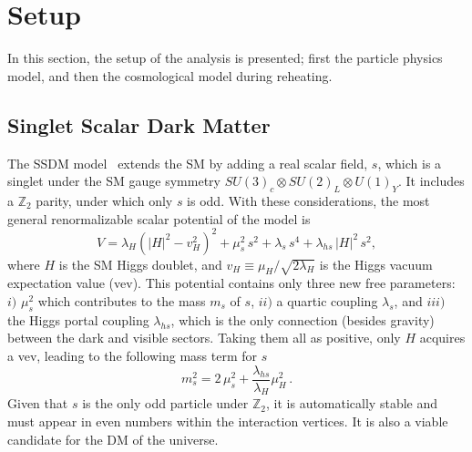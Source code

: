 \documentclass[a4paper,11pt]{article}
\newcommand{\lhs}{\lambda_{hs}}
\newcommand{\mdm}{m_s}
\begin{document}
\section{Setup} \label{sec:setup}
In this section, the setup of the analysis is presented; first the particle physics model, and then the cosmological model during reheating. 

\subsection{Singlet Scalar Dark Matter} %
The SSDM model~\cite{Silveira:1985rk, McDonald:1993ex, Burgess:2000yq} extends the SM by adding a real scalar field, $s$, which is a singlet under the SM gauge symmetry $SU(3)_c \otimes SU(2)_L \otimes U(1)_Y$. It includes a $\mathbb{Z}_2$ parity, under which only $s$ is odd. With these considerations, the most general renormalizable scalar potential of the model is
\begin{equation}
    V = \lambda_H\left(|H|^2-v_H^2\right)^2 + \mu_s^2\,s^2 + \lambda_s\,s^4 + \lhs\,|H|^2\,s^2,
\end{equation}
where $H$ is the SM Higgs doublet, and $v_H \equiv \mu_H/\sqrt{2\lambda_H}$ is the Higgs vacuum expectation value (vev). This potential contains only three new free parameters: $i)$ $\mu^2_s$ which contributes to the mass $\mdm$ of $s$, $ii)$ a quartic coupling $\lambda_s$, and $iii)$ the Higgs portal coupling $\lhs$, which is the only connection (besides gravity) between the dark and visible sectors.
Taking them all as positive, only $H$ acquires a vev, leading to the following mass term for $s$
\begin{equation}
    m^2_s = 2\,\mu_s^2+\frac{\lhs}{\lambda_H}\mu^2_H\,.
\end{equation}
Given that $s$ is the only odd particle under $\mathbb{Z}_2$, it is automatically stable and must appear in even numbers within the interaction vertices. It is also a viable candidate for the DM of the universe.
\end{document}
